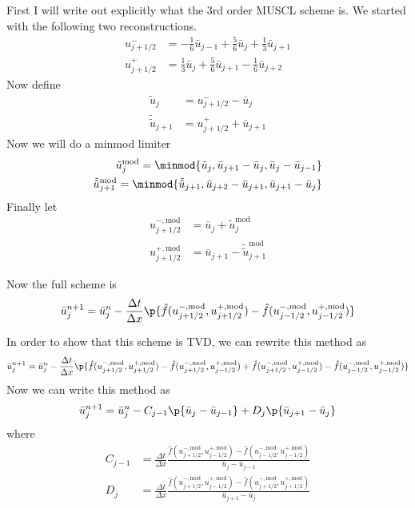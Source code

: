 \documentclass[11pt, oneside]{article}
\newcommand{\doubletilde}[1]{\tilde{\tilde{#1}}}
\begin{document}
\begin{enumerate}
    First I will write out explicitly what the 3rd order MUSCL scheme is.
    We started with the following two reconstructions.
    \begin{align*}
      u_{j+1/2}^- &= -\frac{1}{6} \bar{u}_{j-1} + \frac{5}{6}\bar{u}_j + \frac{1}{3}\bar{u}_{j+1} \\
      u_{j+1/2}^+ &= \frac{1}{3} \bar{u}_{j} + \frac{5}{6}\bar{u}_{j+1} - \frac{1}{6}\bar{u}_{j+2}
    \end{align*}
    Now define
    \begin{align*}
      \tilde{u}_j &= u_{j+1/2}^- - \bar{u}_j \\
      \doubletilde{u}_{j+1} &= u_{j+1/2}^+ + \bar{u}_{j+1}
    \end{align*}
    Now we will do a minmod limiter
    \begin{align*}
      \tilde{u}_j^{\text{mod}} = \minmod{\tilde{u}_j, \bar{u}_{j+1} - \bar{u}_j, \bar{u}_{j} - \bar{u}_{j-1}} \\
      \doubletilde{u}_{j+1}^{\text{mod}} = \minmod{\doubletilde{u}_{j+1}, \bar{u}_{j+2} - \bar{u}_{j+1}, \bar{u}_{j+1} - \bar{u}_{j}}
    \end{align*}
    Finally let
    \begin{align*}
      u_{j+1/2}^{-,\text{mod}} &= \bar{u}_j + \tilde{u}_j^{\text{mod}} \\
      u_{j+1/2}^{+,\text{mod}} &= \bar{u}_{j+1} - \doubletilde{u}_{j+1}^{\text{mod}}
    \end{align*}

    Now the full scheme is
    \[
      \bar{u}^{n+1}_j = \bar{u}^n_j - \frac{\Delta t}{\Delta x} \p{\hat{f}(u_{j+1/2}^{-,\text{mod}}, u_{j+1/2}^{+,\text{mod}}) - \hat{f}(u_{j-1/2}^{-,\text{mod}}, u_{j-1/2}^{+,\text{mod}})}
    \]

    In order to show that this scheme is TVD, we can rewrite this method as
    \[
      \bar{u}^{n+1}_j = \bar{u}^n_j - \frac{\Delta t}{\Delta x} \p{\hat{f}(u_{j+1/2}^{-,\text{mod}}, u_{j+1/2}^{+,\text{mod}}) - \hat{f}(u_{j+1/2}^{-,\text{mod}}, u_{j-1/2}^{+,\text{mod}}) +\hat{f}(u_{j+1/2}^{-,\text{mod}}, u_{j-1/2}^{+,\text{mod}}) - \hat{f}(u_{j-1/2}^{-,\text{mod}}, u_{j-1/2}^{+,\text{mod}})}
    \]
    Now we can write this method as
    \[
      \bar{u}^{n+1}_j = \bar{u}^n_j -  C_{j-1}\p{\bar{u}_j - \bar{u}_{j-1}} + D_j\p{\bar{u}_{j+1} - \bar{u}_j}
    \]
    where
    \begin{align*}
      C_{j-1} &= \frac{\Delta t}{\Delta x} \frac{\hat{f}(u_{j+1/2}^{-,\text{mod}}, u_{j-1/2}^{+,\text{mod}}) - \hat{f}(u_{j-1/2}^{-,\text{mod}}, u_{j-1/2}^{+,\text{mod}})}{\bar{u}_j - \bar{u}_{j-1}} \\
      D_{j} &= \frac{\Delta t}{\Delta x} \frac{\hat{f}(u_{j+1/2}^{-,\text{mod}}, u_{j-1/2}^{+,\text{mod}}) - \hat{f}(u_{j+1/2}^{-,\text{mod}}, u_{j+1/2}^{+,\text{mod}})}{\bar{u}_{j+1} - \bar{u}_{j}}
    \end{align*}


\end{enumerate}
\end{document}
